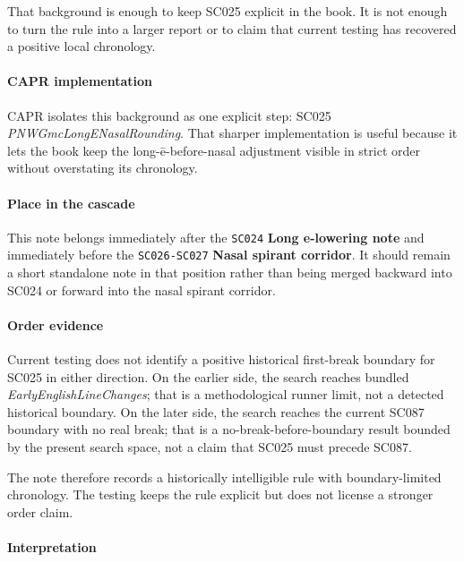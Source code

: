 \documentclass[
  british,
  a4paper,
]{article}
\begin{document}
That background is enough to keep SC025 explicit in the book. It is not
enough to turn the rule into a larger report or to claim that current
testing has recovered a positive local chronology.

\paragraph{CAPR implementation}\label{capr-implementation-18}

CAPR isolates this background as one explicit step: SC025
\emph{PNWGmcLongENasalRounding}. That sharper implementation is useful
because it lets the book keep the long-ē-before-nasal adjustment visible
in strict order without overstating its chronology.

\paragraph{Place in the cascade}\label{place-in-the-cascade-18}

This note belongs immediately after the \texttt{SC024} \textbf{Long
e-lowering note} and immediately before the \texttt{SC026-SC027}
\textbf{Nasal spirant corridor}. It should remain a short standalone
note in that position rather than being merged backward into SC024 or
forward into the nasal spirant corridor.

\paragraph{Order evidence}\label{order-evidence-18}

Current testing does not identify a positive historical first-break
boundary for SC025 in either direction. On the earlier side, the search
reaches bundled \emph{EarlyEnglishLineChanges}; that is a methodological
runner limit, not a detected historical boundary. On the later side, the
search reaches the current SC087 boundary with no real break; that is a
no-break-before-boundary result bounded by the present search space, not
a claim that SC025 must precede SC087.

The note therefore records a historically intelligible rule with
boundary-limited chronology. The testing keeps the rule explicit but
does not license a stronger order claim.

\paragraph{Interpretation}\label{interpretation-18}
\end{document}
